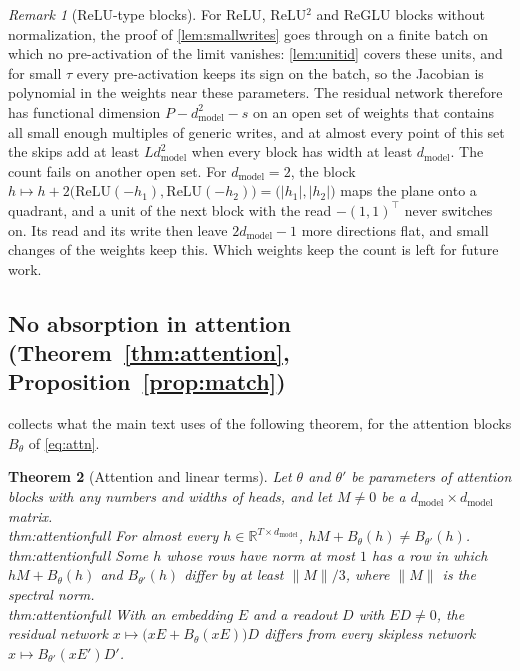 \documentclass[10pt]{article}
\newtheorem{theorem}{Theorem}[section]
\theoremstyle{definition}
\theoremstyle{remark}
\newtheorem{remark}[theorem]{Remark}
\newcommand{\R}{\mathbb{R}}
\newcommand{\dm}{d_{\mathrm{model}}}
\newcommand{\norm}[1]{\lVert #1\rVert}
\newcommand{\ptlabel}[1]{\phantomsection\label{#1}}
\newcommand{\stpart}[3]{\ifx\relax#1\relax\else\ptlabel{#1:#2}\fi{\upshape\bfseries\boldmath(#2)\ifx\relax#3\relax\else\ #3.\fi}}
\begin{document}
\begin{remark}[ReLU-type blocks]\label{rem:reludepth}
For ReLU, ReLU$^2$ and ReGLU blocks without normalization, the proof of \cref{lem:smallwrites} goes through on a finite batch on which no pre-activation of the limit vanishes: \cref{lem:unitid} covers these units, and for small $\tau$ every pre-activation keeps its sign on the batch, so the Jacobian is polynomial in the weights near these parameters. The residual network therefore has functional dimension $P - \dm^2 - s$ on an open set of weights that contains all small enough multiples of generic writes, and at almost every point of this set the skips add at least $L\dm^2$ when every block has width at least $\dm$. The count fails on another open set. For $\dm = 2$, the block $h \mapsto h + 2\big(\mathrm{ReLU}(-h_1), \mathrm{ReLU}(-h_2)\big) = \big(\lvert h_1\rvert, \lvert h_2\rvert\big)$ maps the plane onto a quadrant, and a unit of the next block with the read $-(1, 1)^\top$ never switches on. Its read and its write then leave $2\dm - 1$ more directions flat, and small changes of the weights keep this. Which weights keep the count is left for future work.
\end{remark}

\subsection{No absorption in attention\texorpdfstring{ (Theorem~\ref*{thm:attention}, Proposition~\ref*{prop:match})}{}}\label{app:attention}

 collects what the main text uses of the following theorem, for the attention blocks $B_\theta$ of \cref{eq:attn}.

\begin{theorem}[Attention and linear terms]\label{thm:attentionfull}
Let $\theta$ and $\theta'$ be parameters of attention blocks with any numbers and widths of heads, and let $M \neq 0$ be a $\dm\times\dm$ matrix.\\
\stpart{thm:attentionfull}{i}{} For almost every $h \in \R^{T\times\dm}$, $hM + B_\theta(h) \neq B_{\theta'}(h)$.\\
\stpart{thm:attentionfull}{ii}{} Some $h$ whose rows have norm at most $1$ has a row in which $hM + B_\theta(h)$ and $B_{\theta'}(h)$ differ by at least $\norm{M}/3$, where $\norm{M}$ is the spectral norm.\\
\stpart{thm:attentionfull}{iii}{} With an embedding $E$ and a readout $D$ with $ED \neq 0$, the residual network $x \mapsto \big(xE + B_\theta(xE)\big)D$ differs from every skipless network $x \mapsto B_{\theta'}(xE')D'$.
\end{theorem}
\end{document}
